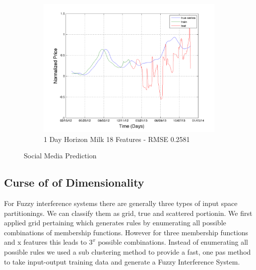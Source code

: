 \begin{figure}
       \hfill
       
        \begin{subfigure}[b]{0.5\textwidth}
                \includegraphics[width=\textwidth]{img/model/exp2/milk/pred_18}
                \caption{1 Day Horizon Milk 18 Features - RMSE 0.2581}
                \label{fig:mouse}
        \end{subfigure}%
    
        \caption{Social Media Prediction}\label{fig:animals}
\end{figure}










\subsection{Curse of of Dimensionality}

For Fuzzy interference systems there are generally three types of input space partitionings. We can classify them as grid, true and scattered portionin. We first applied grid pertaining which generates rules by enumerating all possible combinations of membership functions. However for three membership functions and x features this leads to $3^x$ possible combinations. Instead of enumerating all possible rules we used a sub clustering method to provide a fast, one pas method to take input-output training data and generate a Fuzzy Interference System. 






